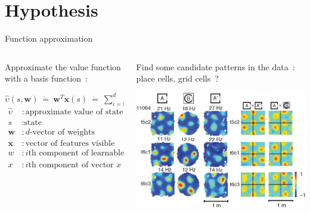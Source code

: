 \documentclass[bigger]{beamer}
\begin{document}
\section{Hypothesis}
\label{sec:org1249b3c}

\begin{frame}[label={sec:orgdd2c3d9}]{Function approximation}
\begin{columns}
\begin{column}{0.5\columnwidth}
\begin{adjustbox}{max width=\columnwidth, keepaspectratio}
Approximate the value function with a \alert{basis function}~:
\end{adjustbox}
\begin{adjustbox}{max width=\columnwidth, keepaspectratio}
\(\hat{\upsilon}(s, \mathrm{\mathbf{w}}) \: \dot{=} \: \mathrm{\mathbf{w}}^T \mathrm{\mathbf{x}}(s) \: \dot{=} \: \displaystyle\sum_{i=1}^{d}  w_i x_i(s)\)
\end{adjustbox}\\[1em]
\begin{adjustbox}{max width=\columnwidth, keepaspectratio}
\(
  \begin{aligned}
\hat{\upsilon} &: \text{approximate value of state $s$ given weight vector $w$}\\
s &: \text{state}\\
\mathrm{\mathbf{w}} &: \text{$d$-vector of weights underlying the approximate value function}\\
\mathrm{\mathbf{x}} &: \text{vector of features visible when in state $s$}\\
w &: \text{$i$th component of learnable weight vector}\\
x &: \text{$i$th component of vector $x(s)$}\\
  \end{aligned}
\)
\end{adjustbox}
\end{column}
\begin{column}{0.5\columnwidth}
\center
\scriptsize
Find some candidate patterns in the data~: place cells, grid cells~?
\normalsize
\begin{center}
\includegraphics[height=0.25\textheight]{img/place-cells-grid-cells.jpg.png}
\end{center}


\end{column}
\end{columns}
\end{frame}
\end{document}
